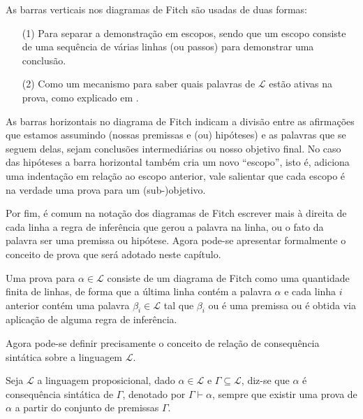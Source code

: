 As barras verticais nos diagramas de Fitch são usadas de duas formas:
\begin{itemize}
    \item[(1)] Para separar a demonstração em escopos, sendo que um escopo consiste de uma sequência de várias linhas (ou passos) para demonstrar uma conclusão.
    \item[(2)] Como um mecanismo para saber quais palavras de $\mathcal{L}$ estão ativas na prova, como explicado em \cite{joaoPavao2014}. 
\end{itemize}

As barras horizontais no diagrama de Fitch indicam a divisão entre  as  afirmações  que  estamos  assumindo  (nossas premissas e (ou) hipóteses) e as palavras que se seguem delas, sejam conclusões intermediárias ou nosso objetivo final. No caso das hipóteses a barra horizontal também cria um novo ``escopo'', isto é, adiciona uma indentação em relação ao escopo anterior, vale salientar que cada escopo é na verdade uma prova para um (sub-)objetivo. 

Por fim, é comum na notação dos diagramas de Fitch escrever mais à direita de cada linha a regra de inferência que gerou a palavra na linha, ou o fato da palavra ser uma premissa ou hipótese. Agora pode-se apresentar formalmente o conceito de prova que será adotado neste capítulo.

\begin{definicao}[Prova]\label{def:Prova}
  Uma prova para $\alpha \in \mathcal{L}$ consiste de um diagrama de Fitch como uma quantidade finita de linhas, de forma que a última linha contém a palavra $\alpha$ e cada linha $i$ anterior contém uma palavra $\beta_i \in \mathcal{L}$ tal que $\beta_i$ ou é uma premissa ou é obtida via aplicação de alguma regra de inferência.
\end{definicao}

Agora pode-se definir precisamente o conceito de relação de consequência sintática sobre a linguagem $\mathcal{L}$.

\begin{definicao}\label{def:ConsequênciaSintatica}
  Seja $\mathcal{L}$ a linguagem proposicional, dado $\alpha \in \mathcal{L}$ e $\Gamma \subseteq \mathcal{L}$, diz-se que $\alpha$ é consequência sintática de $\Gamma$, denotado por $\Gamma \vdash \alpha$, sempre que existir uma prova de $\alpha$ a partir do conjunto de premissas $\Gamma$. 
\end{definicao}

